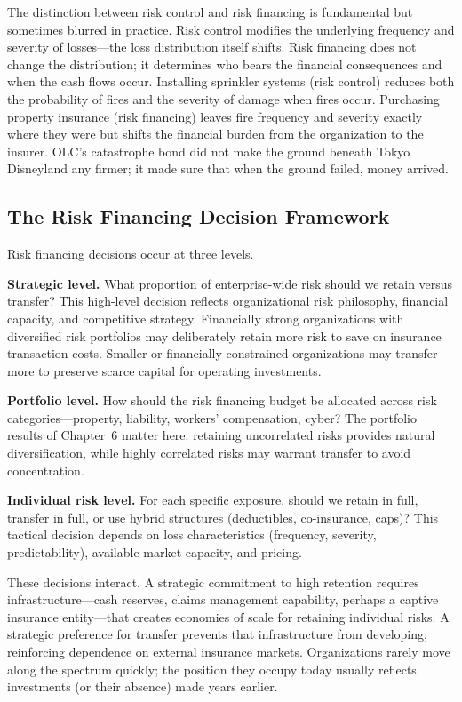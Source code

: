 \documentclass[11pt,openany]{book}
\begin{document}
The distinction between risk control and risk financing is fundamental but
sometimes blurred in practice. Risk control modifies the underlying frequency
and severity of losses---the loss distribution itself shifts. Risk financing
does not change the distribution; it determines who bears the financial
consequences and when the cash flows occur. Installing sprinkler systems
(risk control) reduces both the probability of fires and the severity of
damage when fires occur. Purchasing property insurance (risk financing)
leaves fire frequency and severity exactly where they were but shifts the
financial burden from the organization to the insurer. OLC's catastrophe bond
did not make the ground beneath Tokyo Disneyland any firmer; it made sure
that when the ground failed, money arrived.

\subsection{The Risk Financing Decision Framework}

Risk financing decisions occur at three levels.

\textbf{Strategic level.} What proportion of enterprise-wide risk should we
retain versus transfer? This high-level decision reflects organizational risk
philosophy, financial capacity, and competitive strategy. Financially strong
organizations with diversified risk portfolios may deliberately retain more
risk to save on insurance transaction costs. Smaller or financially
constrained organizations may transfer more to preserve scarce capital for
operating investments.

\textbf{Portfolio level.} How should the risk financing budget be allocated
across risk categories---property, liability, workers' compensation, cyber?
The portfolio results of Chapter~6 matter here:
retaining uncorrelated risks provides natural diversification, while highly
correlated risks may warrant transfer to avoid concentration.

\textbf{Individual risk level.} For each specific exposure, should we retain
in full, transfer in full, or use hybrid structures (deductibles,
co-insurance, caps)? This tactical decision depends on loss characteristics
(frequency, severity, predictability), available market capacity, and
pricing.

These decisions interact. A strategic commitment to high retention requires
infrastructure---cash reserves, claims management capability, perhaps a
captive insurance entity---that creates economies of scale for retaining
individual risks. A strategic preference for transfer prevents that
infrastructure from developing, reinforcing dependence on external insurance
markets. Organizations rarely move along the spectrum quickly; the position
they occupy today usually reflects investments (or their absence) made years
earlier.
\end{document}
